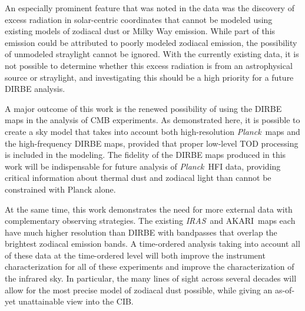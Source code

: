 \documentclass{aa}
\def\Planck{\textit{Planck}}
\def\AKARI{\textrm{{AKARI}}}
\def\IRAS{\textit{{IRAS}}}
\begin{document}
An especially prominent feature that was noted in the data was the discovery of excess radiation in solar-centric coordinates that cannot be modeled using existing models of zodiacal dust or Milky Way emission. While part of this emission could be attributed to poorly modeled zodiacal emission, the possibility of unmodeled straylight cannot be ignored. With the currently existing data, it is not possible to determine whether this excess radiation is from an astrophysical source or straylight, and investigating this should be a high priority for a future DIRBE analysis.

A major outcome of this work is the renewed possibility of using the DIRBE maps in the analysis of CMB experiments. As demonstrated here, it is possible to create a sky model that takes into account both high-resolution \Planck\ maps and the high-frequency DIRBE maps, provided that proper low-level TOD processing is included in the modeling. The fidelity of the DIRBE maps produced in this work will be indispensable for future analysis of \Planck\ HFI data, providing critical information about thermal dust and zodiacal light than cannot be constrained with Planck alone.

At the same time, this work demonstrates the need for more external data with complementary observing strategies. The existing \IRAS\ and \AKARI\ maps each have much higher resolution than DIRBE with bandpasses that overlap the brightest zodiacal emission bands. A time-ordered analysis taking into account all of these data at the time-ordered level will both improve the instrument characterization for all of these experiments and improve the characterization of the infrared sky. In particular, the many lines of sight across several decades will allow for the most precise model of zodiacal dust possible, while giving an as-of-yet unattainable view into the CIB.
\end{document}

